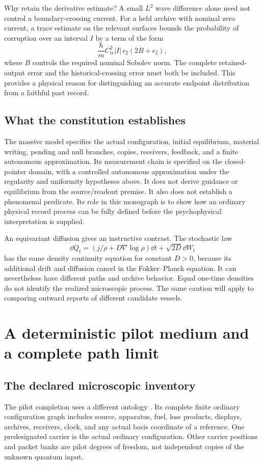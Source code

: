 Why retain the derivative estimate? A small $L^2$ wave difference alone need not control a boundary-crossing current. For a held archive with nominal zero current, a trace estimate on the relevant surfaces bounds the probability of corruption over an interval $I$ by a term of the form
\[
\frac{\hbar}{m}C_{\mathrm{tr}}^2|I|\,\epsilon_2(2B+\epsilon_2),
\]
where $B$ controls the required nominal Sobolev norm. The complete retained-output error and the historical-crossing error must both be included. This provides a physical reason for distinguishing an accurate endpoint distribution from a faithful past record.

\section{What the constitution establishes}\label{section:massive:what-the-constitution-establishes}
The massive model specifies the actual configuration, initial equilibrium, material writing, pending and null branches, copies, receivers, feedback, and a finite autonomous approximation. Its measurement chain is specified on the closed-pointer domain, with a controlled autonomous approximation under the regularity and uniformity hypotheses above. It does not derive guidance or equilibrium from the source/readout premise. It also does not establish a phenomenal predicate. Its role in this monograph is to show how an ordinary physical record process can be fully defined before the psychophysical interpretation is supplied.

An equivariant diffusion gives an instructive contrast. The stochastic law
\[
\dd Q_t=\left(j/\rho+D\nabla\log\rho\right)\dd t+\sqrt{2D}\dd W_t
\]
has the same density continuity equation for constant $D>0$, because its additional drift and diffusion cancel in the Fokker--Planck equation. It can nevertheless have different paths and archive behavior. Equal one-time densities do not identify the realized microscopic process. The same caution will apply to comparing outward reports of different candidate vessels.

\chapter{A deterministic pilot medium and a complete path limit}\label{ch:pilot}
\section{The declared microscopic inventory}\label{section:pilot:the-declared-microscopic-inventory}
The pilot completion uses a different ontology \cite{RodgersPilot,RodgersMeasurement}. Its complete finite ordinary configuration graph includes source, apparatus, fuel, loss products, displays, archives, receivers, clock, and any actual basis coordinate of a reference. One predesignated carrier is the actual ordinary configuration. Other carrier positions and packet banks are pilot degrees of freedom, not independent copies of the unknown quantum input.

